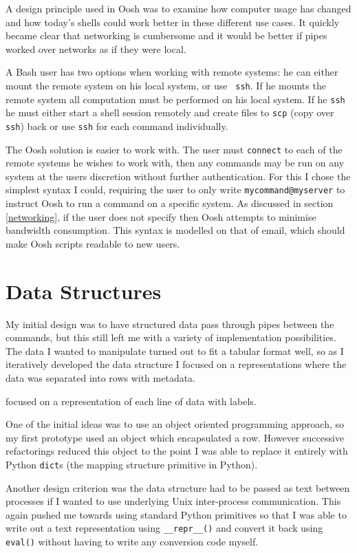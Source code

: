 \documentclass[12pt,twoside,notitlepage]{report}
\begin{document}
A design principle used in Oosh was to examine how computer usage has
changed and how today's shells could work better in these different
use cases. It quickly became clear that networking is cumbersome and
it would be better if pipes worked over networks as if they were
local.

A Bash user has two options when working with remote systems: he can
either mount the remote system on his local system, or use {\tt
  ssh}. If he mounts the remote system all computation must be
performed on his local system. If he {\tt ssh} he must either start a
shell session remotely and create files to {\tt scp} (copy over {\tt
  ssh}) back or use {\tt ssh} for each command individually.

The Oosh solution is easier to work with. The user must {\tt connect}
to each of the remote systems he wishes to work with, then any
commands may be run on any system at the users discretion without
further authentication. For this I chose the simplest syntax I could,
requiring the user to only write {\tt mycommand@myserver} to instruct
Oosh to run a command on a specific system. As discussed in section
\ref{networking}, if the user does not specify then Oosh attempts to
minimise bandwidth consumption. This syntax is modelled on that of
email, which should make Oosh scripts readable to new users.

\section{Data Structures}
My initial design was to have structured data pass through pipes between the
commands, but this still left me with a variety of implementation
possibilities. The data I wanted to manipulate turned out to fit a tabular
format well, so as I iteratively developed the data structure I
focused on a representations where the data was separated into rows
with metadata.

 focused on a representation of each line of data
with labels. %

One of the initial ideas was to use an object oriented programming
approach, so my first prototype used an object which encapsulated
a row. However successive refactorings reduced this object to the point
I was able to replace it entirely with Python {\tt dict}s (the mapping
structure primitive in Python).

Another design criterion was the data structure had to be passed as
text between processes if I wanted to use underlying Unix
inter-process communication. This again pushed me towards using
standard Python primitives so that I was able to write out a text
representation using {\tt \_\_repr\_\_()} and convert it back using
{\tt eval()} without having to write any conversion code myself.
\end{document}
